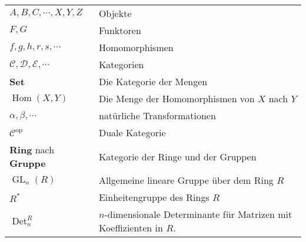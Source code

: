 \documentclass[a4paper]{amsart}
\theoremstyle{definition}
\DeclareMathOperator{\Det}{Det}
\DeclareMathOperator{\Hom}{Hom}
\DeclareMathOperator{\GL}{GL}
\begin{document}
\begin{tabular}{ll}
    $A, B, C, \cdots, X, Y, Z$          & Objekte\\
    $F,G$                               & Funktoren\\
    $f, g, h, r, s, \cdots$             & Homomorphismen\\
    $\mathcal C, \mathcal D, \mathcal E, \cdots$ & Kategorien\\
    \textbf{Set}                        & Die Kategorie der Mengen\\
    $\Hom( X, Y)$                       & Die Menge der Homomorphismen von $X$ nach $Y$\\
    $\alpha, \beta, \cdots$             & natürliche Transformationen\\
    $\mathcal C ^{\text{op}}$           & Duale Kategorie\\
    \textbf{Ring} nach \textbf{Gruppe}  & Kategorie der Ringe und der Gruppen\\
    $\GL_n(R)$                          & Allgemeine lineare Gruppe über dem Ring $R$\\
    $R^*$                               & Einheitengruppe des Rings $R$\\
    $\Det_n^R$                          & $n$-dimensionale Determinante für Matrizen mit Koeffizienten in $R$. 
    
\end{tabular}
\end{document}
